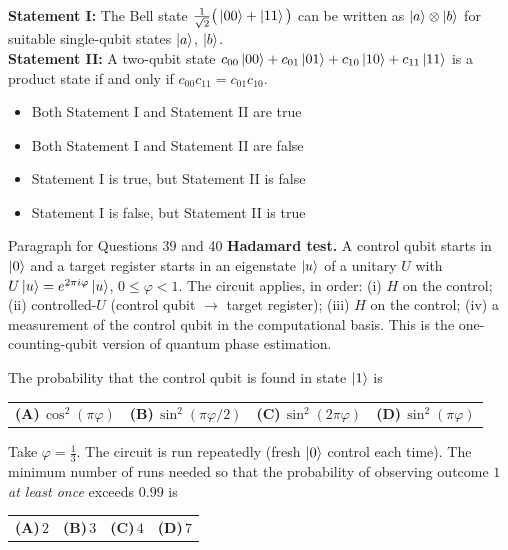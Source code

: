 \documentclass[11pt,a4paper]{article}
\newcommand{\optlabel}[1]{\textbf{(#1)}}
\newenvironment{qitem}[1]{\begin{list}{}{\setlength{\leftmargin}{3.3em}\setlength{\labelwidth}{3.1em}%
  \setlength{\labelsep}{0.2em}\setlength{\topsep}{3pt}\setlength{\parsep}{3pt}}\item[\textbf{Q.#1}\hfill]}{\end{list}}
\newcommand{\qsep}{\par\vspace{2pt}{\color{black!15}\hrule}\vspace{4pt}}
\begin{document}
\begin{qitem}{38}
\textbf{Statement I:} The Bell state $\frac{1}{\sqrt2}\big(\ket{00} + \ket{11}\big)$ can be written as $\ket{a}\otimes\ket{b}$ for
suitable single-qubit states $\ket a$, $\ket b$.\\[1mm]
\textbf{Statement II:} A two-qubit state $c_{00}\ket{00} + c_{01}\ket{01} + c_{10}\ket{10} + c_{11}\ket{11}$ is a product state if and only
if $c_{00}c_{11} = c_{01}c_{10}$.
\begin{itemize}[leftmargin=2.6em, labelsep=0.4em, itemsep=2pt, topsep=3pt]
\item[\optlabel{A}] Both Statement I and Statement II are true
\item[\optlabel{B}] Both Statement I and Statement II are false
\item[\optlabel{C}] Statement I is true, but Statement II is false
\item[\optlabel{D}] Statement I is false, but Statement II is true
\end{itemize}
\end{qitem}
\qsep

\begin{passagebox}{Paragraph for Questions 39 and 40}
\textbf{Hadamard test.} A control qubit starts in $\ket{0}$ and a target register starts in an eigenstate $\ket{u}$
of a unitary $U$ with $U\ket{u} = e^{2\pi i\varphi}\ket{u}$, $0 \le \varphi < 1$. The circuit applies, in order:
(i) $H$ on the control; (ii) controlled-$U$ (control qubit $\to$ target register); (iii) $H$ on the control;
(iv) a measurement of the control qubit in the computational basis. This is the one-counting-qubit version of quantum
phase estimation.
\end{passagebox}
\begin{qitem}{39}
The probability that the control qubit is found in state $\ket1$ is
\par\smallskip\noindent\begin{tabularx}{\linewidth}{@{}*{4}{L}@{}}
\optlabel{A}\,$\cos^2(\pi\varphi)$ & \optlabel{B}\,$\sin^2(\pi\varphi/2)$ & \optlabel{C}\,$\sin^2(2\pi\varphi)$ & \optlabel{D}\,$\sin^2(\pi\varphi)$
\end{tabularx}
\end{qitem}
\qsep

\begin{qitem}{40}
Take $\varphi = \frac13$. The circuit is run repeatedly (fresh $\ket0$ control each time). The minimum number of runs
needed so that the probability of observing outcome $1$ \emph{at least once} exceeds $0.99$ is
\par\smallskip\noindent\begin{tabularx}{\linewidth}{@{}*{4}{L}@{}}
\optlabel{A}\,$2$ & \optlabel{B}\,$3$ & \optlabel{C}\,$4$ & \optlabel{D}\,$7$
\end{tabularx}
\end{qitem}
\qsep
\end{document}
